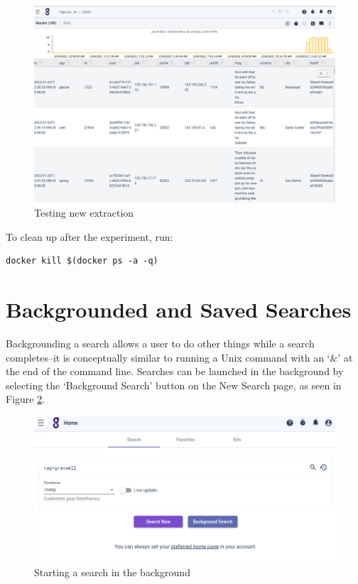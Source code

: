 \begin{figure}
	\includegraphics[width=0.8\linewidth]{images/lab-test-ax.png}
	\caption{Testing new extraction}
	\label{fig:lab-test-ax}
\end{figure}

To clean up after the experiment, run:

\begin{Verbatim}[breaklines=true]
docker kill $(docker ps -a -q)
\end{Verbatim}



\section{Backgrounded and Saved Searches}
Backgrounding a search allows a user to do other things while a search
completes--it is conceptually similar to running a Unix command with
an `\&' at the end of the command line. Searches can be launched in the
background by selecting the `Background Search' button on the New Search
page, as seen in Figure \ref{fig:bg-new-search}.


\begin{figure}
	\includegraphics[width=0.8\linewidth]{images/bg-new-search.png}
	\caption{Starting a search in the background}
	\label{fig:bg-new-search}
\end{figure}

